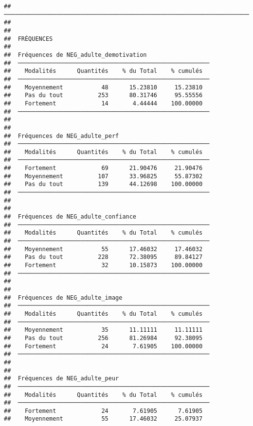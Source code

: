 \documentclass[
]{article}
\begin{document}
\begin{verbatim}
##  ──────────────────────────────────────────────────────────────────────────────────────────────────────────────────────────────────────────────────────────────────────────────────────────────────────────────────────────────────────── 
## 
## 
##  FRÉQUENCES
## 
##  Fréquences de NEG_adulte_demotivation                   
##  ─────────────────────────────────────────────────────── 
##    Modalités      Quantités    % du Total    % cumulés   
##  ─────────────────────────────────────────────────────── 
##    Moyennement           48      15.23810     15.23810   
##    Pas du tout          253      80.31746     95.55556   
##    Fortement             14       4.44444    100.00000   
##  ─────────────────────────────────────────────────────── 
## 
## 
##  Fréquences de NEG_adulte_perf                           
##  ─────────────────────────────────────────────────────── 
##    Modalités      Quantités    % du Total    % cumulés   
##  ─────────────────────────────────────────────────────── 
##    Fortement             69      21.90476     21.90476   
##    Moyennement          107      33.96825     55.87302   
##    Pas du tout          139      44.12698    100.00000   
##  ─────────────────────────────────────────────────────── 
## 
## 
##  Fréquences de NEG_adulte_confiance                      
##  ─────────────────────────────────────────────────────── 
##    Modalités      Quantités    % du Total    % cumulés   
##  ─────────────────────────────────────────────────────── 
##    Moyennement           55      17.46032     17.46032   
##    Pas du tout          228      72.38095     89.84127   
##    Fortement             32      10.15873    100.00000   
##  ─────────────────────────────────────────────────────── 
## 
## 
##  Fréquences de NEG_adulte_image                          
##  ─────────────────────────────────────────────────────── 
##    Modalités      Quantités    % du Total    % cumulés   
##  ─────────────────────────────────────────────────────── 
##    Moyennement           35      11.11111     11.11111   
##    Pas du tout          256      81.26984     92.38095   
##    Fortement             24       7.61905    100.00000   
##  ─────────────────────────────────────────────────────── 
## 
## 
##  Fréquences de NEG_adulte_peur                           
##  ─────────────────────────────────────────────────────── 
##    Modalités      Quantités    % du Total    % cumulés   
##  ─────────────────────────────────────────────────────── 
##    Fortement             24       7.61905      7.61905   
##    Moyennement           55      17.46032     25.07937   

\end{verbatim}
\end{document}
